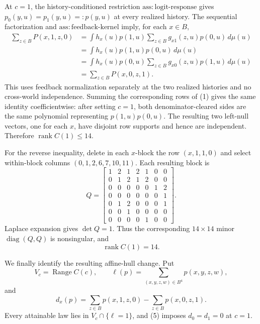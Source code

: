 At \(c=1\), the history-conditioned restriction \(\mathrm{ass{:}logit\text{-}response}\) gives \(p_0(y,u)=p_1(y,u)=:p(y,u)\) at every realized history.  The sequential factorization and \(\mathrm{ass{:}feedback\text{-}kernel}\) imply, for each \(x\in B\),
\[
\begin{aligned}
 \sum_{z\in B}P(x,1,z,0)
 &=\int h_x(u)p(1,u)
      \sum_{z\in B}g_{x1}(z,u)p(0,u)\,d\mu(u)\\
 &=\int h_x(u)p(1,u)p(0,u)\,d\mu(u)\\
 &=\int h_x(u)p(0,u)
      \sum_{z\in B}g_{x0}(z,u)p(1,u)\,d\mu(u)\\
 &=\sum_{z\in B}P(x,0,z,1).
\end{aligned} \tag{5}
\]
This uses feedback normalization separately at the two realized histories and no cross-world independence.  Summing the corresponding rows of (1) gives the same identity coefficientwise: after setting \(c=1\), both denominator-cleared sides are the same polynomial representing \(p(1,u)p(0,u)\).  The resulting two left-null vectors, one for each \(x\), have disjoint row supports and hence are independent.  Therefore \(\operatorname{rank}C(1)\le14\).

For the reverse inequality, delete in each \(x\)-block the row \((x,1,1,0)\) and select within-block columns \((0,1,2,6,7,10,11)\).  Each resulting block is
\[
 Q=\begin{bmatrix}
1&2&1&2&1&0&0\\
0&1&2&1&2&0&0\\
0&0&0&0&0&1&2\\
0&0&0&0&0&0&1\\
0&1&2&0&0&0&1\\
0&0&1&0&0&0&0\\
0&0&0&0&1&0&0
\end{bmatrix}. \tag{6}
\]
Laplace expansion gives \(\det Q=1\).  Thus the corresponding \(14\times14\) minor \(\operatorname{diag}(Q,Q)\) is nonsingular, and
\[
 \operatorname{rank}C(1)=14. \tag{7}
\]

We finally identify the resulting affine-hull change.  Put
\[
 V_c=\operatorname{Range}C(c),
 \qquad
 \ell(p)=\sum_{(x,y,z,w)\in B^4}p(x,y,z,w),
\]
and
\[
 d_x(p)=\sum_{z\in B}p(x,1,z,0)-\sum_{z\in B}p(x,0,z,1). \tag{8}
\]
Every attainable law lies in \(V_c\cap\{\ell=1\}\), and (5) imposes \(d_0=d_1=0\) at \(c=1\).

